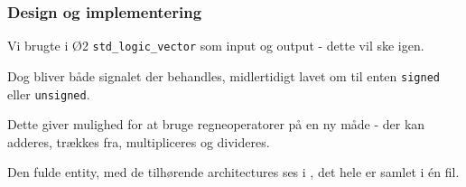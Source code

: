 \subsubsection{Design og implementering}

Vi brugte i Ø2 \texttt{std\_logic\_vector} som input og output - dette vil ske igen. 

Dog bliver både signalet der behandles, midlertidigt lavet om til enten \texttt{signed} eller \texttt{unsigned}.

Dette giver mulighed for at bruge regneoperatorer på en ny måde - der kan adderes, trækkes fra, multipliceres og divideres.




Den fulde entity, med de tilhørende architectures ses i , det hele er samlet i én fil.




